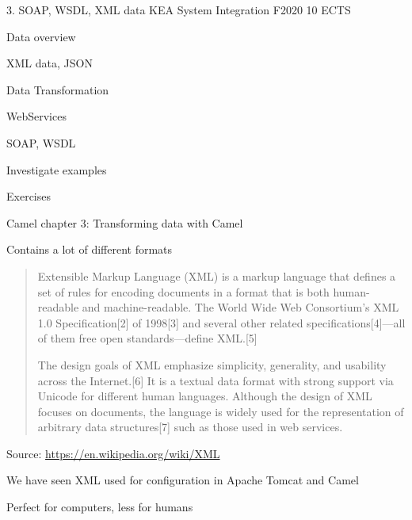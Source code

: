 \documentclass[Screen16to9,17pt]{foils}
\begin{document}
\mytitlepage
{3. SOAP, WSDL, XML data}
{KEA System Integration F2020 10 ECTS}


\begin{list2}
\item Data overview
\item XML data, JSON
\item Data Transformation
\item WebServices
\item SOAP, WSDL
\item Investigate examples
\end{list2}

Exercises
\begin{list2}
\item
\item
\end{list2}




\begin{list1}
\item Camel chapter 3: Transforming data with Camel
\item Contains a lot of different formats
\end{list1}




\begin{quote}
  Extensible Markup Language (XML) is a markup language that defines a set of rules for encoding documents in a format that is both human-readable and machine-readable. The World Wide Web Consortium's XML 1.0 Specification[2] of 1998[3] and several other related specifications[4]—all of them free open standards—define XML.[5]

  The design goals of XML emphasize simplicity, generality, and usability across the Internet.[6] It is a textual data format with strong support via Unicode for different human languages. Although the design of XML focuses on documents, the language is widely used for the representation of arbitrary data structures[7] such as those used in web services.
\end{quote}
Source: \url{https://en.wikipedia.org/wiki/XML}

\begin{list2}
\item We have seen XML used for configuration in Apache Tomcat and Camel
\item Perfect for computers, less for humans
\end{list2}
\end{document}
